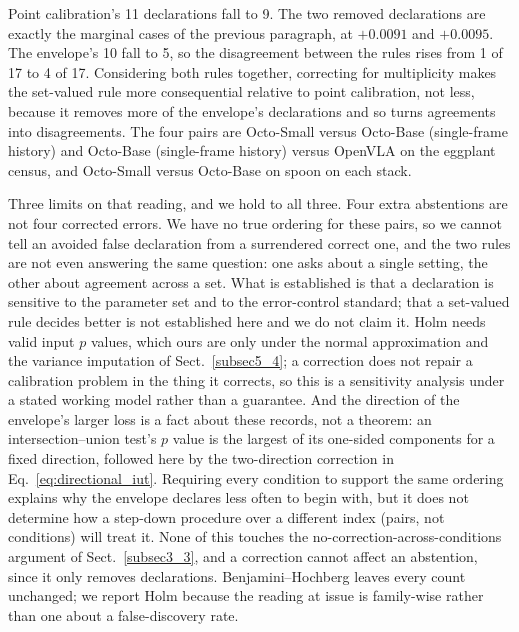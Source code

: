 \documentclass[pdflatex,iicol,sn-apa]{sn-jnl}
\theoremstyle{remark}
\begin{document}
\noindent Point
calibration's 11 declarations fall to 9. The two removed declarations are exactly the marginal cases of the
previous paragraph, at $+0.0091$ and $+0.0095$. The envelope's 10 fall to 5, so the
disagreement between the rules rises from 1 of 17 to 4 of 17. Considering both rules together, correcting for multiplicity makes the set-valued rule more
consequential relative to point calibration, not less, because it removes more of the envelope's
declarations and so turns agreements into disagreements. The four pairs are
Octo-Small versus Octo-Base (single-frame history) and Octo-Base (single-frame history) versus OpenVLA on
the eggplant census, and Octo-Small versus Octo-Base on spoon on each stack.

Three limits on that reading, and we hold to all three. Four extra abstentions are not four
corrected errors. We have no true ordering for these pairs, so we cannot tell an avoided false
declaration from a surrendered correct one, and the two rules are not even answering the same
question: one asks about a single setting, the other about agreement across a set. What is
established is that a declaration is sensitive to the parameter set and to the error-control
standard; that a set-valued rule decides better is not established here and we do not claim
it. Holm needs valid input $p$ values, which ours are only under the normal approximation
and the variance imputation of Sect.~\ref{subsec5_4}; a correction does not repair a calibration
problem in the thing it corrects, so this is a sensitivity analysis under a stated working model
rather than a guarantee. And the direction of the envelope's larger loss is a fact about
these records, not a theorem: an intersection--union test's $p$ value is the largest of its
one-sided components for a fixed direction, followed here by the two-direction correction in
Eq.~\eqref{eq:directional_iut}. Requiring every condition to support the same ordering explains
why the envelope declares less often to begin with, but it does not
determine how a step-down procedure over a different index (pairs, not conditions) will treat
it. None of this touches the no-correction-across-conditions argument of Sect.~\ref{subsec3_3}, and
a correction cannot affect an abstention, since it only removes declarations. Benjamini--Hochberg
leaves every count unchanged; we report Holm because the reading at issue is family-wise rather than
one about a false-discovery rate.
\end{document}
